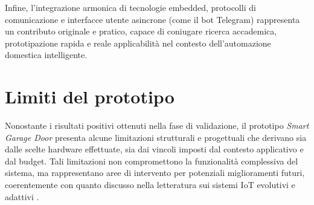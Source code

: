 Infine, l'integrazione armonica di tecnologie embedded, protocolli di comunicazione e interfacce utente asincrone (come il bot Telegram) rappresenta un contributo originale e pratico, capace di coniugare ricerca accademica, prototipazione rapida e reale applicabilità nel contesto dell'automazione domestica intelligente.

\section{Limiti del prototipo}
Nonostante i risultati positivi ottenuti nella fase di validazione, il prototipo \textit{Smart Garage Door} presenta alcune limitazioni strutturali e progettuali che derivano sia dalle scelte hardware effettuate, sia dai vincoli imposti dal contesto applicativo e dal budget. Tali limitazioni non compromettono la funzionalità complessiva del sistema, ma rappresentano aree di intervento per potenziali miglioramenti futuri, coerentemente con quanto discusso nella letteratura sui sistemi IoT evolutivi e adattivi \cite{Perera2015}.

